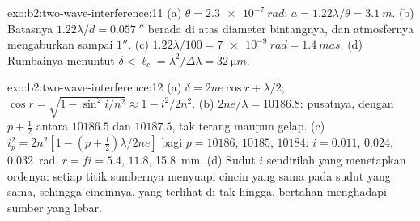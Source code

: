 \begin{solution}{exo:b2:two-wave-interference:11}
(a) $\theta = \qty{2.3e-7}{rad}$: $a = 1.22\lambda/\theta = \qty{3.1}{m}$. (b) Batasnya $1.22\lambda/d =
\qty{0.057}{''}$ berada di atas diameter bintangnya, dan atmosfernya mengaburkan
sampai $1''$. (c) $1.22\lambda/100 = \qty{7e-9}{rad} = \qty{1.4}{mas}$. (d) Rumbainya menuntut
$\delta < \ell_c = \lambda^2/\Delta\lambda = \qty{32}{\micro m}$.
\end{solution}

\begin{solution}{exo:b2:two-wave-interference:12}
(a) $\delta = 2ne\cos r + \lambda/2$; $\cos r = \sqrt{1 - \sin^2i/n^2} \approx 1 - i^2/2n^2$.
(b) $2ne/\lambda = 10186.8$: pusatnya, dengan $p + \tfrac12$ antara $10186.5$ dan
$10187.5$, tak terang maupun gelap. (c) $i_p^2 = 2n^2[1 - (p + \tfrac12)\lambda/
2ne]$ bagi $p = 10186$, $10185$, $10184$: $i = 0.011$, $0.024$, \qty{0.032}{rad}, $r = fi
= 5.4$, $11.8$, \qty{15.8}{mm}. (d) Sudut $i$ sendirilah yang menetapkan ordenya: setiap
titik sumbernya menyuapi cincin yang sama pada sudut yang sama, sehingga cincinnya, yang terlihat
di tak hingga, bertahan menghadapi sumber yang lebar.
\end{solution}

